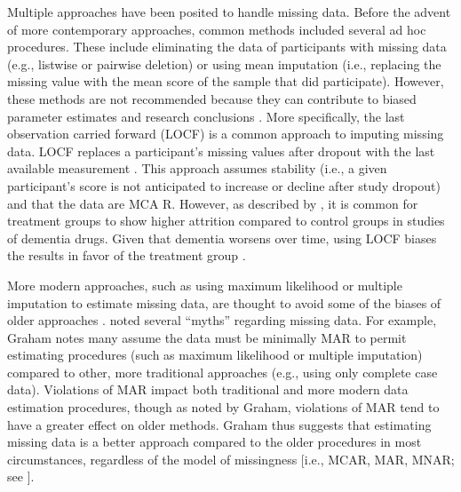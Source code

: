 \documentclass[
  10pt,
  letterpaper,
]{article}
\begin{document}
Multiple approaches have been posited to handle missing data. Before the
advent of more contemporary approaches, common methods included several
ad hoc procedures. These include eliminating the data of participants
with missing data (e.g., listwise or pairwise deletion) or using mean
imputation (i.e., replacing the missing value with the mean score of the
sample that did participate). However, these methods are not recommended
because they can contribute to biased parameter estimates and research
conclusions \citep[see][]{graham2009}. More specifically, the last
observation carried forward (LOCF) is a common approach to imputing
missing data. LOCF replaces a participant's missing values after dropout
with the last available measurement \citep{molnar2008}. This approach
assumes stability (i.e., a given participant's score is not anticipated
to increase or decline after study dropout) and that the data are MCA R.
However, as described by \citet{molnar2008}, it is common for treatment
groups to show higher attrition compared to control groups in studies of
dementia drugs. Given that dementia worsens over time, using LOCF biases
the results in favor of the treatment group \citep[see][for more
details]{molnar2008}.

More modern approaches, such as using maximum likelihood or multiple
imputation to estimate missing data, are thought to avoid some of the
biases of older approaches \citep[see][]{enders2010, graham2009}.
\citet{graham2009} noted several ``myths'' regarding missing data. For
example, Graham notes many assume the data must be minimally MAR to
permit estimating procedures (such as maximum likelihood or multiple
imputation) compared to other, more traditional approaches (e.g., using
only complete case data). Violations of MAR impact both traditional and
more modern data estimation procedures, though as noted by Graham,
violations of MAR tend to have a greater effect on older methods. Graham
thus suggests that estimating missing data is a better approach compared
to the older procedures in most circumstances, regardless of the model
of missingness {[}i.e., MCAR, MAR, MNAR; see \citet{graham2009}{]}.
\end{document}
